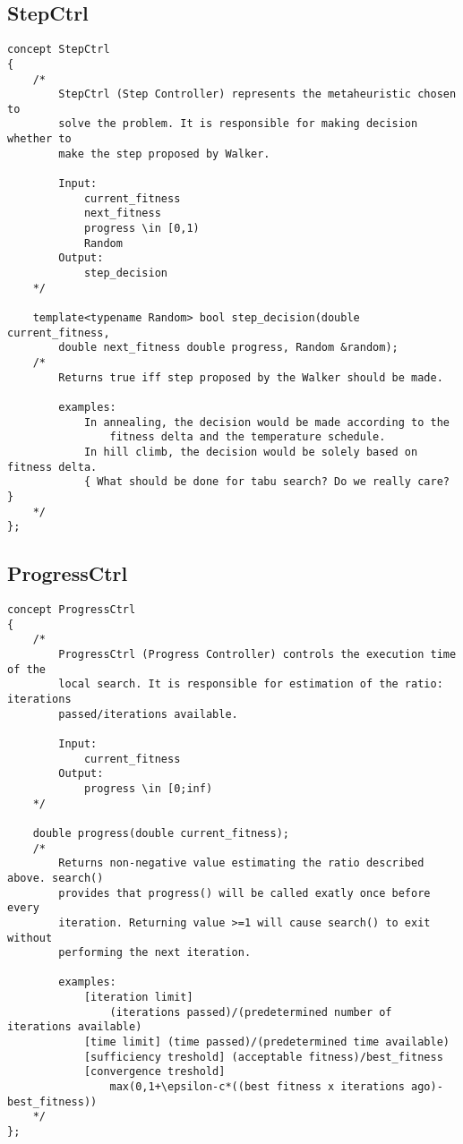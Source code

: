 \subsection{StepCtrl}
\begin{lstlisting}
concept StepCtrl
{
	/*
		StepCtrl (Step Controller) represents the metaheuristic chosen to
		solve the problem. It is responsible for making decision whether to
		make the step proposed by Walker.
		
		Input:
			current_fitness
			next_fitness
			progress \in [0,1)
			Random
		Output:
			step_decision
	*/

	template<typename Random> bool step_decision(double current_fitness,
		double next_fitness double progress, Random &random);
	/*
		Returns true iff step proposed by the Walker should be made.
		
		examples:	
			In annealing, the decision would be made according to the
				fitness delta and the temperature schedule.
			In hill climb, the decision would be solely based on fitness delta.
			{ What should be done for tabu search? Do we really care? }
	*/
};
\end{lstlisting}

\subsection{ProgressCtrl}

\begin{lstlisting}
concept ProgressCtrl
{
	/*
		ProgressCtrl (Progress Controller) controls the execution time of the
		local search. It is responsible for estimation of the ratio: iterations
		passed/iterations available.

		Input:
			current_fitness
		Output:
			progress \in [0;inf)
	*/

	double progress(double current_fitness);
	/*
		Returns non-negative value estimating the ratio described above. search()
		provides that progress() will be called exatly once before every
		iteration. Returning value >=1 will cause search() to exit without
		performing the next iteration.

		examples:
			[iteration limit]
				(iterations passed)/(predetermined number of iterations available)
			[time limit] (time passed)/(predetermined time available)
			[sufficiency treshold] (acceptable fitness)/best_fitness
			[convergence treshold]
				max(0,1+\epsilon-c*((best fitness x iterations ago)-best_fitness))
	*/
};
\end{lstlisting}

